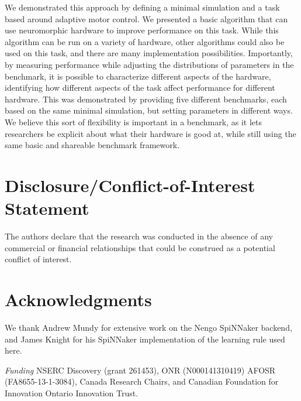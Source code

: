 \documentclass{frontiersSCNS} %
\begin{document}
We demonstrated this approach by defining a minimal simulation and a task
based around adaptive motor control.  We presented a basic algorithm that
can use neuromorphic hardware to improve performance on this task.  While this
algorithm can be run on a variety of hardware, other algorithms could also
be used on this task, and there are many implementation possibilities.
Importantly, by measuring performance while adjusting the distributions of
parameters in the benchmark, it is possible to characterize different aspects
of the hardware, identifying how different aspects of the task affect
performance for different hardware.  This was demonstrated by providing
five different benchmarks, each based on the same minimal simulation, but
setting parameters in different ways.  We believe this sort of flexibility
is important in a benchmark, as it lets researchers be explicit about what
their hardware is good at, while still using the same basic and shareable
benchmark framework.

\section*{Disclosure/Conflict-of-Interest Statement}

The authors declare that the research was conducted in the absence of any commercial or financial relationships that could be construed as a potential conflict of interest.

\section*{Acknowledgments}

We thank Andrew Mundy for extensive work on the Nengo SpiNNaker backend, and
James Knight for his SpiNNaker implementation of the learning rule used here.

\textit{Funding\textcolon} 
NSERC Discovery (grant 261453),
ONR (N000141310419)
AFOSR (FA8655-13-1-3084),
Canada Research Chairs,
and Canadian Foundation for Innovation
Ontario Innovation Trust.



\end{document}
